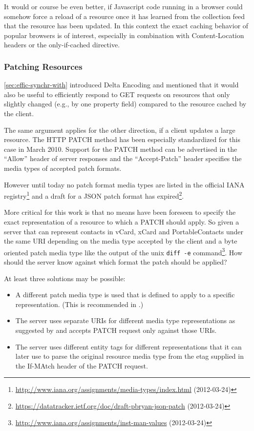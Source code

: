 \documentclass[11pt,a4paper,headsepline,twoside]{scrartcl}		%
\newcommand{\citeurl}[2]{\url{#1} (#2)}
\begin{document}
It would or course be even better, if Javascript code running in a browser could
somehow force a reload of a resource once it has learned from the collection
feed that the resource has been updated. In this context the exact caching
behavior of popular browsers is of interest, especially in combination with
Content-Location headers or the only-if-cached directive.

\subsubsection{Patching Resources}
\label{sec:patching-resources}

\autoref{sec:effic-synchr-with} introduced Delta Encoding \cite{RFC3229} and
mentioned that it would also be useful to efficiently respond to GET requests on
resources that only slightly changed (e.g., by one property field) compared to
the resource cached by the client.

The same argument applies for the other direction, if a client updates a large
resource. The HTTP PATCH method \cite{RFC5789} has been especially standardized
for this case in March 2010. Support for the PATCH method can be advertised in
the ``Allow'' header of server responses and the ``Accept-Patch'' header
specifies the media types of accepted patch formats.

However until today no patch format media types are listed in the official IANA
registry\footnote{\citeurl{http://www.iana.org/assignments/media-types/index.html}{2012-03-24}}
and a draft for a JSON patch format has
expired\footnote{\citeurl{https://datatracker.ietf.org/doc/draft-pbryan-json-patch}{2012-03-24}}.

More critical for this work is that no means have been foreseen to specify the
exact representation of a resource to which a PATCH should apply. So given a
server that can represent contacts in vCard, xCard and PortableContacts under
the same URI depending on the media type accepted by the client and a byte
oriented patch media type like the output of the unix \lstinline:diff -e:
command\footnote{\citeurl{http://www.iana.org/assignments/inst-man-values}{2012-03-24}}. How
should the server know against which format the patch should be applied?

At least three solutions may be possible:
\begin{itemize}
\item A different patch media type is used that is defined to apply to a specific
  representation. (This is recommended in \cite[ch. 11.9]{Allamaraju_2010}.)
\item The server uses separate URIs for different media type representations as
  suggested by \cite{Raman2006} and accepts PATCH request only against those
  URIs.
\item The server uses different entity tags for different representations that
  it can later use to parse the original resource media type from the etag
  supplied in the If-MAtch header of the PATCH request.
\end{itemize}
\end{document}
